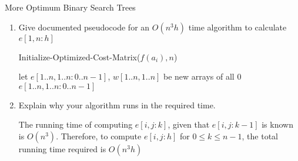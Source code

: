 \documentclass{article}
\numberwithin{table}{section}
\numberwithin{figure}{section}
\begin{document}
\begin{section}{More Optimum Binary Search Trees}
\begin{enumerate}
    \item  Give documented pseudocode for an $O(n^3h)$ time algorithm to calculate $e[1, n : h]$
    \begin{tcolorbox}
        \begin{minipage}{\linewidth}
        \begin{algorithm}[H]
        \caption{Initialize-Optimized-Cost-Matrix($f(a_i), n$)}
        let $e[1..n, 1..n : 0..n-1]$, $w[1..n, 1..n]$ be new arrays of all 0 \\
        \KwRet $e[1..n, 1..n : 0..n-1]$
        \end{algorithm}
        \end{minipage}
    \end{tcolorbox}
    
    \item Explain why your algorithm runs in the required time.
    \begin{tcolorbox}
        The running time of computing $e[i,j : k]$, given that $e[i,j : k-1]$ is known is $O(n^3)$. Therefore, to compute $e[i,j : h]$ for $0 \leq k \leq n-1$, the total running time required is $O(n^3h)$
    \end{tcolorbox}
\end{enumerate}
\end{section}
\end{document}
